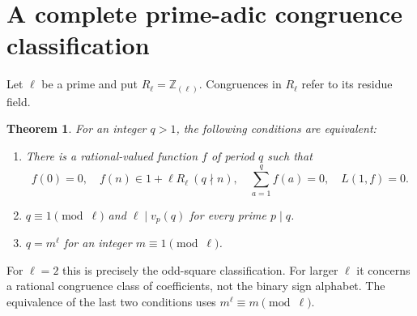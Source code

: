 \documentclass[11pt]{amsart}
\newtheorem{theorem}{Theorem}[section]
\theoremstyle{definition}
\theoremstyle{remark}
\numberwithin{equation}{section}
\begin{document}
\section{A complete prime-adic congruence classification}

Let $\ell$ be a prime and put $R_\ell=\mathbb Z_{(\ell)}$.
Congruences in $R_\ell$ refer to its residue field.

\begin{theorem}\label{thm:ell-classification}
For an integer $q>1$, the following conditions are equivalent:
\begin{enumerate}
\item There is a rational-valued function $f$ of period $q$ such that
\[
 f(0)=0,\quad f(n)\in1+\ell R_\ell\ (q\nmid n),\quad
 \sum_{a=1}^qf(a)=0,\quad L(1,f)=0.
\]
\item $q\equiv1\pmod\ell$ and $\ell\mid v_p(q)$ for every prime $p\mid q$.
\item $q=m^\ell$ for an integer $m\equiv1\pmod\ell$.
\end{enumerate}
\end{theorem}

For $\ell=2$ this is precisely the odd-square classification.
For larger $\ell$ it concerns a rational congruence class of coefficients,
not the binary sign alphabet. The equivalence of the last two conditions
uses $m^\ell\equiv m\pmod\ell$.
\end{document}
